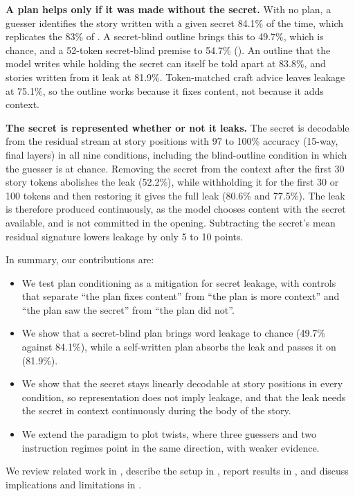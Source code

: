 {\bf A plan helps only if it was made without the secret.}
With no plan, a guesser identifies the story written with a given secret 84.1\% of the time, which replicates the 83\% of \citet{holtzman2026secret}.
A secret-blind outline brings this to 49.7\%, which is chance, and a 52-token secret-blind premise to 54.7\% ().
An outline that the model writes while holding the secret can itself be told apart at 83.8\%, and stories written from it leak at 81.9\%.
Token-matched craft advice leaves leakage at 75.1\%, so the outline works because it fixes content, not because it adds context.

{\bf The secret is represented whether or not it leaks.}
The secret is decodable from the residual stream at story positions with 97 to 100\% accuracy (15-way, final layers) in all nine conditions, including the blind-outline condition in which the guesser is at chance.
Removing the secret from the context after the first 30 story tokens abolishes the leak (52.2\%), while withholding it for the first 30 or 100 tokens and then restoring it gives the full leak (80.6\% and 77.5\%).
The leak is therefore produced continuously, as the model chooses content with the secret available, and is not committed in the opening.
Subtracting the secret's mean residual signature lowers leakage by only 5 to 10 points.

In summary, our contributions are:
\begin{itemize}[leftmargin=*,itemsep=0pt,topsep=0pt]
    \item We test plan conditioning as a mitigation for secret leakage, with controls that separate ``the plan fixes content'' from ``the plan is more context'' and ``the plan saw the secret'' from ``the plan did not''.
    \item We show that a secret-blind plan brings word leakage to chance (49.7\% against 84.1\%), while a self-written plan absorbs the leak and passes it on (81.9\%).
    \item We show that the secret stays linearly decodable at story positions in every condition, so representation does not imply leakage, and that the leak needs the secret in context continuously during the body of the story.
    \item We extend the paradigm to plot twists, where three guessers and two instruction regimes point in the same direction, with weaker evidence.
\end{itemize}

We review related work in , describe the setup in , report results in , and discuss implications and limitations in .
